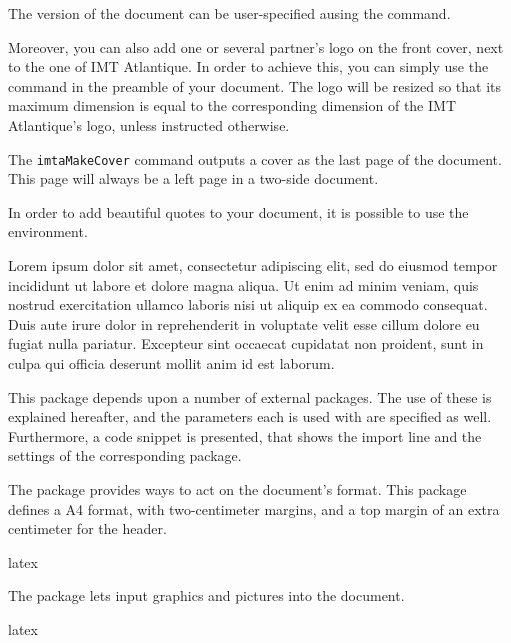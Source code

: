\documentclass{report}
\begin{document}
The version of the document can be user-specified ausing the  command.

Moreover, you can also add one or several partner's logo on the front cover, next to the one of IMT Atlantique. 
In order to achieve this, you can simply use the  command in the preamble of your document. 
The logo will be resized so that its maximum dimension is equal to the corresponding dimension of the IMT Atlantique's logo, unless instructed otherwise.



The \texttt{imtaMakeCover} command outputs a cover as the last page of the document.
This page will always be a left page in a two-side document.


\label{sec:core:quote}
In order to add beautiful quotes to your document, it is possible to use the  environment.

\begin{imtaQuote}
Lorem ipsum dolor sit amet, consectetur adipiscing elit, sed do eiusmod tempor incididunt ut labore et dolore magna aliqua. 
Ut enim ad minim veniam, quis nostrud exercitation ullamco laboris nisi ut aliquip ex ea commodo consequat. 
Duis aute irure dolor in reprehenderit in voluptate velit esse cillum dolore eu fugiat nulla pariatur.
Excepteur sint occaecat cupidatat non proident, sunt in culpa qui officia deserunt mollit anim id est laborum.
\end{imtaQuote}



This package depends upon a number of external packages.
The use of these is explained hereafter, and the parameters each is used with are specified as well.
Furthermore, a code snippet is presented, that shows the import line and the settings of the corresponding package.


The  package provides ways to act on the document's format.
This package defines a A4 format, with two-centimeter margins, and a top margin of an extra centimeter for the header.

\begin{imtaCode}{latex}
\RequirePackage[a4paper, margin=2cm, top=3cm]{geometry}
\end{imtaCode}


The  package lets input graphics and pictures into the document.

\begin{imtaCode}{latex}
\RequirePackage{graphicx}
\end{imtaCode}
\end{document}
